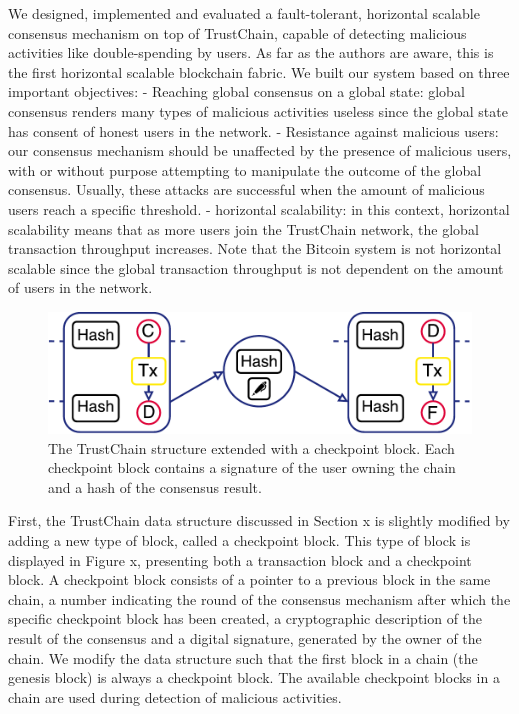 \documentclass[USenglish]{article}
\begin{document}
We designed, implemented and evaluated a fault-tolerant, horizontal scalable consensus mechanism on top of TrustChain, capable of detecting malicious activities like double-spending by users.
As far as the authors are aware, this is the first horizontal scalable blockchain fabric.
We built our system based on three important objectives:
- Reaching global consensus on a global state: global consensus renders many types of malicious activities useless since the global state has consent of honest users in the network.
- Resistance against malicious users: our consensus mechanism should be unaffected by the presence of malicious users, with or without purpose attempting to manipulate the outcome of the global consensus. Usually, these attacks are successful when the amount of malicious users reach a specific threshold.
- horizontal scalability: in this context, horizontal scalability means that as more users join the TrustChain network, the global transaction throughput increases. Note that the Bitcoin system is not horizontal scalable since the global transaction throughput is not dependent on the amount of users in the network.

\begin{figure}[h!]
	\centering
	\includegraphics[width=0.8\columnwidth]{assets/trustchain_cp}
	\caption{The TrustChain structure extended with a checkpoint block. Each checkpoint block contains a signature of the user owning the chain and a hash of the consensus result.}
	\label{fig:trustchain_cp}
\end{figure}

First, the TrustChain data structure discussed in Section x is slightly modified by adding a new type of block, called a checkpoint block.
This type of block is displayed in Figure x, presenting both a transaction block and a checkpoint block.
A checkpoint block consists of a pointer to a previous block in the same chain, a number indicating the round of the consensus mechanism after which the specific checkpoint block has been created, a cryptographic description of the result of the consensus and a digital signature, generated by the owner of the chain.
We modify the data structure such that the first block in a chain (the genesis block) is always a checkpoint block.
The available checkpoint blocks in a chain are used during detection of malicious activities.
\end{document}

